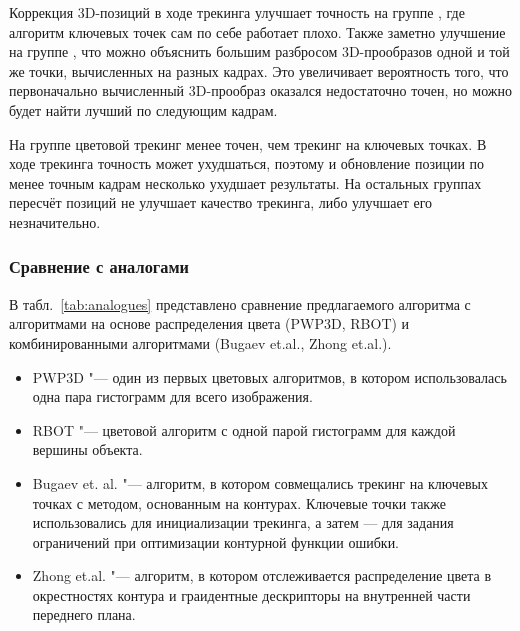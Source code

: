 Коррекция 3D-позиций в ходе трекинга улучшает точность на группе , где алгоритм ключевых точек сам по себе работает плохо.
Также заметно улучшение на группе , что можно объяснить
большим разбросом 3D-прообразов одной и той же точки, вычисленных на разных
кадрах.
Это увеличивает вероятность того, что первоначально вычисленный 3D-прообраз
оказался недостаточно точен, но можно будет найти лучший по следующим кадрам.

На группе  цветовой трекинг менее точен, чем трекинг на ключевых
точках.
В ходе трекинга точность может ухудшаться, поэтому и обновление позиции по
менее точным кадрам несколько ухудшает результаты.
На остальных группах пересчёт позиций не улучшает качество трекинга, либо
улучшает его незначительно.


\subsubsection{Сравнение с аналогами}

В табл.~\ref{tab:analogues} представлено сравнение предлагаемого алгоритма с
алгоритмами на основе распределения цвета (PWP3D, RBOT) и комбинированными
алгоритмами (Bugaev et.al., Zhong et.al.).

\begin{itemize}
\item PWP3D "--- один из первых цветовых алгоритмов, в котором использовалась
одна пара гистограмм для всего изображения.
\item RBOT "--- цветовой алгоритм с одной парой гистограмм для каждой вершины
объекта.
\item Bugaev et. al. "--- алгоритм, в котором совмещались трекинг на ключевых
точках с методом, основанным на контурах. Ключевые точки также использовались
для инициализации трекинга, а затем --- для задания ограничений при оптимизации
контурной функции ошибки.
\item Zhong et.al. "--- алгоритм, в котором отслеживается распределение цвета в
окрестностях контура и граидентные дескрипторы на внутренней части переднего
плана.
\end{itemize}

